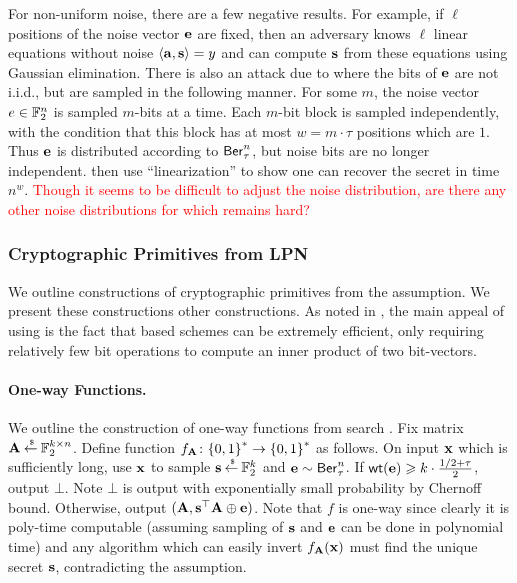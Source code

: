 For non-uniform noise, there are a few negative results.
For example, if $\ell$ positions of the noise vector ${\mathbf e}$ are fixed, then an adversary knows $\ell$ linear equations without noise $\left\langle{\ensuremath{{\mathbf a}}},{{\mathbf s}}\right\rangle = y$ and can compute ${\mathbf s}$ from these equations using Gaussian elimination.
There is also an attack due to \cite{ICALP:AroGe11} where the bits of ${\mathbf e}$ are not i.i.d., but are sampled in the following manner.
For some $m$, the noise vector $e \in {\mathbb F}_2^n$ is sampled $m$-bits at a time.
Each $m$-bit block is sampled independently, with the condition that this block has at most $w = m \cdot \tau$ positions which are $1$.
Thus ${\mathbf e}$ is distributed according to $\mathsf{Ber}_\tau^n$, but noise bits are no longer independent.
\cite{ICALP:AroGe11} then use ``linearization'' to show one can recover the secret in time $n^w$.
\textcolor{red}{Though it seems to be difficult to adjust the noise distribution, are there any other noise distributions for which \LPN remains hard?}

\subsubsection{Cryptographic Primitives from LPN}
We outline constructions of cryptographic primitives from the \LPN assumption.
We present these constructions \visavis other constructions.
As noted in \cite{TCC:Pietrzak12}, the main appeal of using \LPN is the fact that \LPN based schemes can be extremely efficient, only requiring relatively few bit operations to compute an inner product of two bit-vectors.

\paragraph{One-way Functions.} We outline the construction of one-way functions from search \LPN.
Fix matrix ${\mathbf A}\mathbin{\stackrel{\mbox{\,\tiny \$}}{\gets}} {\mathbb F}_2^{k\times n}$.
Define function $f_{\mathbf A} \colon {\{0,1\}}^* \rightarrow {\{0,1\}}^*$ as follows.
On input ${\mathbf x}$ which is sufficiently long, use ${\mathbf x}$ to sample ${\mathbf s} \mathbin{\stackrel{\mbox{\,\tiny \$}}{\gets}} {\mathbb F}_2^k$ and ${\mathbf e} \sim \mathsf{Ber}_\tau^n$.
If $\mathsf{wt}({\mathbf e})\geqslant k\cdot \frac{1/2+\tau}{2}$, output $\bot$.
Note $\bot$ is output with exponentially small probability by Chernoff bound.
Otherwise, output $({\mathbf A}, {\mathbf s}^\top{\mathbf A}\oplus{\mathbf e})$.
Note that $f$ is one-way since clearly it is poly-time computable (assuming sampling of ${\mathbf s}$ and ${\mathbf e}$ can be done in polynomial time) and any algorithm which can easily invert $f_{\mathbf A}({\mathbf x})$ must find the unique secret ${\mathbf s}$, contradicting the \LPN assumption.

